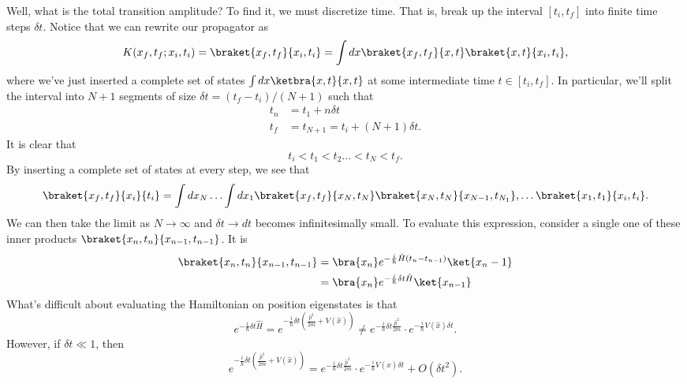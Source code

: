 Well, what is the total transition amplitude? To find it, we must discretize time. That is, break up the interval $[t_i,t_f]$ into finite time steps $\delta t$. Notice that we can rewrite our propagator as
\begin{equation}
    K(x_f,t_f; x_i, t_i) = \braket{x_f, t_f}{x_i,t_i} = \int dx \braket{x_f,t_f}{x,t} \braket{x,t}{x_i,t_i},
\end{equation}
where we've just inserted a complete set of states $\int dx \ketbra{x,t}{x,t}$ at some intermediate time $t\in [t_i,t_f]$. In particular, we'll split the interval into $N+1$ segments of size $\delta t= (t_f-t_i)/(N+1)$ such that
\begin{align}
    t_n &= t_1 +n\delta t\\
    t_f &= t_{N+1} = t_i + (N+1)\delta t.
\end{align}
It is clear that
\begin{equation}
    t_i < t_1 < t_2 \ldots < t_N < t_f.
\end{equation}
By inserting a complete set of states at every step, we see that
\begin{equation}
    \braket{x_f,t_f}{x_i}{t_i} =\int dx_N \ldots \int dx_1 \braket{x_f,t_f}{x_N,t_N} \braket{x_N,t_N}{x_{N-1},t_{N_1}},\ldots \braket{x_1,t_1}{x_i,t_i}.
\end{equation}
We can then take the limit as $N\to \infty$ and $\delta t \to dt$ becomes infinitesimally small. To evaluate this expression, consider a single one of these inner products $\braket{x_n,t_n} {x_{n-1},t_{n-1}}$. It is
\begin{align}
    \braket{x_n,t_n} {x_{n-1},t_{n-1}} &= \bra{x_n} e^{-\frac{i}{\hbar} \hat H(t_n-t_{n-1})} \ket{x_n-1}\\
        &= \bra{x_n} e^{-\frac{i}{\hbar} \delta t \hat H} \ket{x_{n-1}}
\end{align}
What's difficult about evaluating the Hamiltonian on position eigenstates is that
\begin{equation}
    e^{-\frac{i}{\hbar} \delta t \hat H} = e^{-\frac{i}{\hbar}\delta t( \frac{\hat p^2}{2m} + V(\hat x))} \neq e^{-\frac{i}{\hbar} \delta t \frac{\hat p^2}{2m}} \cdot e^{-\frac{i}{\hbar} V(\hat x) \delta t}.
\end{equation}
However, if $\delta t \ll 1$, then
\begin{equation}
    e^{-\frac{i}{\hbar}\delta t( \frac{\hat p^2}{2m} + V(\hat x))} = e^{-\frac{i}{\hbar} \delta t \frac{\hat p^2}{2m}} \cdot e^{-\frac{i}{\hbar} V(\hat x) \delta t} + O(\delta t^2).
\end{equation}
